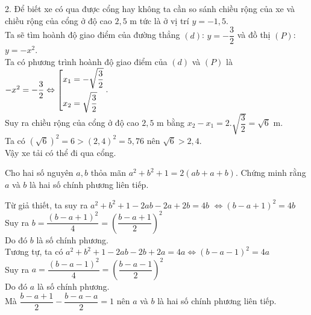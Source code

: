 \begin{ex}
{\begin{center}
\begin{tikzpicture}[thick,>=stealth,x=1cm,y=1cm,scale=1]
			\end{tikzpicture}
		\end{center}
		2. Để biết xe có qua được cổng hay không ta cần so sánh chiều rộng của xe và chiều rộng của cổng ở độ cao $2,5$ m tức là ở vị trí $y=-1,5$.
		\\ Ta sẽ tìm hoành độ giao điểm của đường thẳng $(d)$: $y=-\dfrac{3}{2}$ và đồ thị $(P)$: $y=-x^2$.
		\\ Ta có phương trình hoành độ giao điểm của $(d)$ và $(P)$ là $-x^2=-\dfrac{3}{2}\Leftrightarrow \hoac{& x_1=-\sqrt{\dfrac{3}{2}}\\& x_2=\sqrt{\dfrac{3}{2}}}$.
		\\ Suy ra chiều rộng của cổng ở độ cao $2,5$ m bằng $x_2-x_1=2.\sqrt{\dfrac{3}{2}}=\sqrt{6}$ m.
		\\ Ta có $(\sqrt{6})^2=6>(2,4)^2=5,76$ nên $\sqrt{6}>2,4$.
		\\ Vậy xe tải có thể đi qua cổng.  
	}
\end{ex}
\begin{ex}%
	Cho hai số nguyên $a,b$ thỏa mãn $a^2+b^2+1=2 \left( ab+a+b\right) $. Chứng minh rằng $a$ và $b$ là hai số chính phương liên tiếp.
	\loigiai
	{Từ giả thiết, ta suy ra $a^2+b^2+1-2ab-2a+2b=4b$
		$\Leftrightarrow {\left( b-a+1\right) }^2=4b$\\
		Suy ra $b=\dfrac{{\left( b-a+1\right) }^2}{4} ={\left( \dfrac{b-a+1}{2}\right) }^2$\\
		Do đó $b$ là số chính phương.\\
		Tương tự, ta có $a^2+b^2+1-2ab-2b+2a=4a\Leftrightarrow {\left( b-a-1\right) }^2=4a$\\
		Suy ra $a=\dfrac{{\left( b-a-1\right) }^2}{4} ={\left( \dfrac{b-a-1}{2}\right) }^2$\\
		Do đó $a$ là số chính phương.\\
		Mà $\dfrac{b-a+1}{2}-\dfrac{b-a-a}{2} =1$ nên $a$ và $b$ là hai số chính phương liên tiếp.
		
	}
\end{ex}

